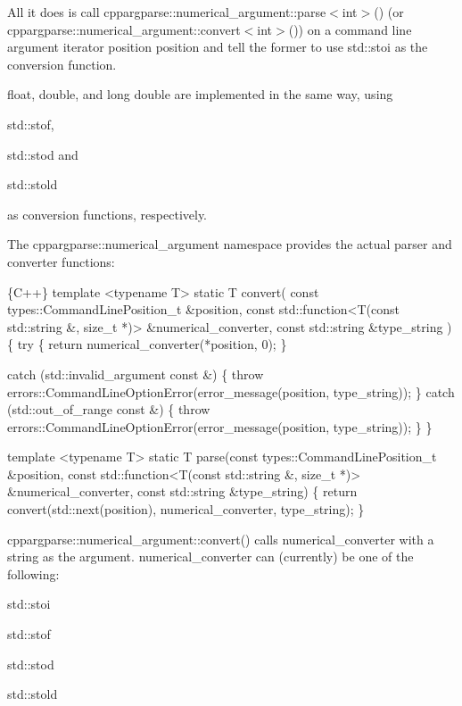 All it does is call {\ttfamily cppargparse\+::numerical\+\_\+argument\+::parse$<$int$>$()} (or {\ttfamily cppargparse\+::numerical\+\_\+argument\+::convert$<$int$>$()}) on a command line argument iterator position {\ttfamily position} and tell the former to use {\ttfamily std\+::stoi} as the conversion function.

{\ttfamily float}, {\ttfamily double}, and {\ttfamily long double} are implemented in the same way, using
\begin{DoxyItemize}
\item {\ttfamily std\+::stof},
\item {\ttfamily std\+::stod} and
\item {\ttfamily std\+::stold}
\end{DoxyItemize}

as conversion functions, respectively.

The {\ttfamily cppargparse\+::numerical\+\_\+argument} namespace provides the actual parser and converter functions\+: 
\begin{DoxyCode}
\{C++\}
template <typename T>
static T convert(
        const types::CommandLinePosition\_t &position,
        const std::function<T(const std::string &, size\_t *)> &numerical\_converter,
        const std::string &type\_string
    )
\{
    try
    \{
        return numerical\_converter(*position, 0);
    \}

    catch (std::invalid\_argument const &)
    \{
        throw errors::CommandLineOptionError(error\_message(position, type\_string));
    \}
    catch (std::out\_of\_range const &)
    \{
        throw errors::CommandLineOptionError(error\_message(position, type\_string));
    \}
\}

template <typename T>
static T parse(const types::CommandLinePosition\_t &position,
        const std::function<T(const std::string &, size\_t *)> &numerical\_converter,
        const std::string &type\_string)
\{
    return convert(std::next(position), numerical\_converter, type\_string);
\}
\end{DoxyCode}


{\ttfamily cppargparse\+::numerical\+\_\+argument\+::convert()} calls {\ttfamily numerical\+\_\+converter} with a string as the argument. {\ttfamily numerical\+\_\+converter} can (currently) be one of the following\+:
\begin{DoxyItemize}
\item {\ttfamily std\+::stoi}
\item {\ttfamily std\+::stof}
\item {\ttfamily std\+::stod}
\item {\ttfamily std\+::stold}
\end{DoxyItemize}

